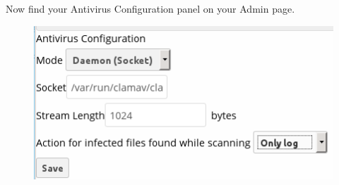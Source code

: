 \documentclass[letterpaper,10pt,english]{sphinxmanual}
\begin{document}
Now find your Antivirus Configuration panel on your Admin page.
\begin{figure}[htbp]
\centering

\includegraphics{antivirus-config.png}
\end{figure}
\end{document}
